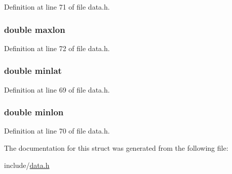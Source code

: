 Definition at line 71 of file data.\+h.

\subsubsection[{\texorpdfstring{maxlon}{maxlon}}]{\setlength{\rightskip}{0pt plus 5cm}double maxlon}\hypertarget{struct_bounds_a2ac2c59e3c0eb6ec8661c8ff1ea04b83}{}\label{struct_bounds_a2ac2c59e3c0eb6ec8661c8ff1ea04b83}


Definition at line 72 of file data.\+h.

\subsubsection[{\texorpdfstring{minlat}{minlat}}]{\setlength{\rightskip}{0pt plus 5cm}double minlat}\hypertarget{struct_bounds_ae6882148ee59d0266307fd7a39b8945c}{}\label{struct_bounds_ae6882148ee59d0266307fd7a39b8945c}


Definition at line 69 of file data.\+h.

\subsubsection[{\texorpdfstring{minlon}{minlon}}]{\setlength{\rightskip}{0pt plus 5cm}double minlon}\hypertarget{struct_bounds_a59ff75088f2d17feafb6a6cb7b52cc0c}{}\label{struct_bounds_a59ff75088f2d17feafb6a6cb7b52cc0c}


Definition at line 70 of file data.\+h.



The documentation for this struct was generated from the following file\+:\begin{DoxyCompactItemize}
\item 
include/\hyperlink{data_8h}{data.\+h}\end{DoxyCompactItemize}
